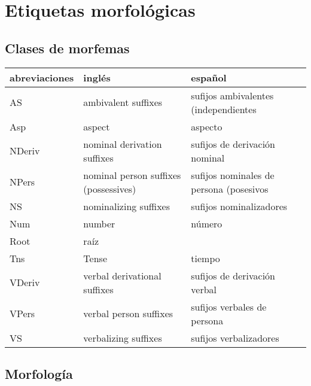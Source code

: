 \documentclass[a4paper,10pt]{scrartcl}
\begin{document}
\appendix
 
\section{Etiquetas morfol\'ogicas}\label{Ap:morf}
\subsection{Clases de morfemas}\label{Ap:clases}

\begin{center}
\begin{tabular}{lll}
abreviaciones & ingl\'es & espa\~nol\\ \midrule
AS & ambivalent suffixes & sufijos ambivalentes (independientes\\
Asp & aspect & aspecto\\
NDeriv & nominal derivation suffixes & sufijos de derivaci\'on nominal\\
NPers & nominal person suffixes (possessives) &sufijos nominales de persona (posesivos\\
NS & nominalizing suffixes & sufijos nominalizadores\\
Num & number & n\'umero\\
Root & ra\'iz\\
Tns & Tense & tiempo \\
VDeriv & verbal derivational suffixes & sufijos de derivaci\'on verbal\\
VPers & verbal person suffixes & sufijos verbales de persona\\
VS & verbalizing suffixes & sufijos verbalizadores\\
\end{tabular}
\end{center}


\subsection{Morfolog\'ia}\label{Ap:tags}
\end{document}
